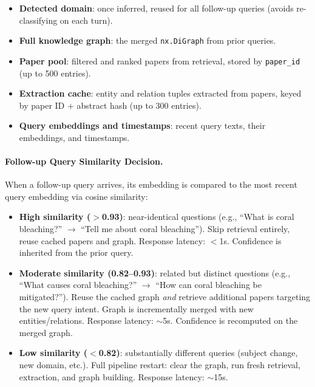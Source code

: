 \documentclass[11pt]{article}
\begin{document}
\begin{itemize}[leftmargin=1.2em]
  \item \textbf{Detected domain}: once inferred, reused for all follow-up queries (avoids re-classifying on each turn).
  \item \textbf{Full knowledge graph}: the merged \texttt{nx.DiGraph} from prior queries.
  \item \textbf{Paper pool}: filtered and ranked papers from retrieval, stored by \texttt{paper\_id} (up to 500 entries).
  \item \textbf{Extraction cache}: entity and relation tuples extracted from papers, keyed by paper ID + abstract hash (up to 300 entries).
  \item \textbf{Query embeddings and timestamps}: recent query texts, their embeddings, and timestamps.
\end{itemize}

\paragraph{Follow-up Query Similarity Decision.}

When a follow-up query arrives, its embedding is compared to the most recent query embedding via cosine similarity:

\begin{itemize}[leftmargin=1.2em]
  \item \textbf{High similarity ($>$0.93)}: near-identical questions (e.g., ``What is coral bleaching?'' $\rightarrow$ ``Tell me about coral bleaching''). Skip retrieval entirely, reuse cached papers and graph. Response latency: $<$1s. Confidence is inherited from the prior query.
  
  \item \textbf{Moderate similarity (0.82--0.93)}: related but distinct questions (e.g., ``What causes coral bleaching?'' $\rightarrow$ ``How can coral bleaching be mitigated?''). Reuse the cached graph \emph{and} retrieve additional papers targeting the new query intent. Graph is incrementally merged with new entities/relations. Response latency: $\sim$5s. Confidence is recomputed on the merged graph.
  
  \item \textbf{Low similarity ($<$0.82)}: substantially different queries (subject change, new domain, etc.). Full pipeline restart: clear the graph, run fresh retrieval, extraction, and graph building. Response latency: $\sim$15s.
\end{itemize}
\end{document}
